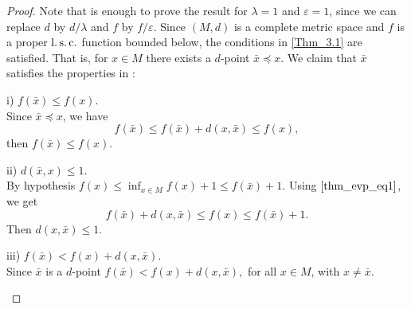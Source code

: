     \begin{proof}
        Note that is enough to prove the result for $\lambda = 1$ and $\varepsilon = 1$,
        since we can replace $d$ by $d/\lambda$ and $f$ by $f/ \varepsilon$. Since
        $(M,d)$ is a complete metric space and $f$ is a proper $\operatorname{l.s.c.}$ function bounded
        below, the conditions in \eqref{Thm_3.1} are satisfied. That is, for $x \in M$
        there exists a $d$-point $\bar{x} \preceq x$. We claim that $\bar{x}$ satisfies
        the properties in :
        \begin{asparaenum}
            \item[i)] $f(\bar{x}) \leq f(x)$. \\
                Since $\bar{x} \preceq x$, we have
                \begin{equation} \label{thm_evp_eq1}
                    f(\bar{x}) \leq f(\bar{x}) + d(x, \bar{x}) \leq f(x),
                \end{equation}
                then
                $
                    f(\bar{x}) \leq f(x).
                $
            \item[ii)] $d(\bar{x}, x) \leq 1$. \\
                By hypothesis 
                $
                    f(x) \leq \inf_{x \in M} f(x) + 1 \leq f(\bar{x}) + 1.
                $
                Using $\eqref{thm_evp_eq1}$, we get
                $$
                    f(\bar{x}) + d(x, \bar{x}) \leq f(x) \leq f(\bar{x}) + 1.
                $$
                Then 
                $
                    d(x, \bar{x}) \leq 1.
                $
            \item[iii)] $f(\bar{x}) < f(x) + d(x, \bar{x})$. \\
                Since $\bar{x}$ is  a $d$-point 
                $
                    f(\bar{x}) <  f(x) + d(x, \bar{x}),
                $
                for all $x \in M$, with $x \neq \bar{x}$.
        \end{asparaenum}
    \end{proof}
    
